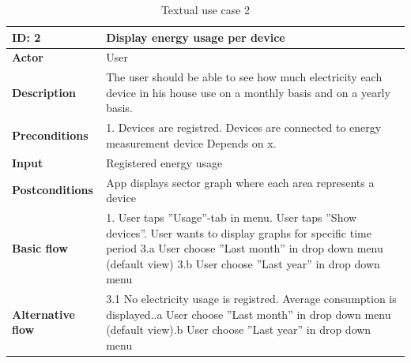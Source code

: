 \begin{table}[H]
\begin{tabular}{|l|p{11.7cm}|}
\hline
\textbf{ID: }2&\textbf{Display energy usage per device}\\\hline
\textbf{Actor} &User\\\hline
\textbf{Description}&
The user should be able to see how much electricity each device in his house use on a monthly basis and on a yearly basis.\\\hline
\textbf{Preconditions}&
1. Devices are registred\newline
2. Devices are connected to energy measurement device\newline
Depends on x.\\\hline
\textbf{Input}&
Registered energy usage\\\hline
\textbf{Postconditions}& App displays sector graph where each area represents a device\\\hline
\textbf{Basic flow}&
1. User taps ''Usage''-tab in menu\newline
2. User taps ''Show devices''\newline
3. User wants to display graphs for specific time period\newline
3.a User choose ''Last month'' in drop down menu (default view)\newline
3.b User choose ''Last year'' in drop down menu\\\hline
\textbf{Alternative flow}&
3.1 No electricity usage is registred. Average consumption is displayed.\newline
3.1.a User choose ''Last month'' in drop down menu (default view)\newline
3.1.b User choose ''Last year'' in drop down menu\\\hline
\end{tabular}
\caption{Textual use case 2}
\end{table}

